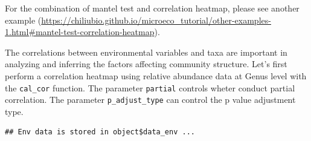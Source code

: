 \documentclass[
]{book}
\newenvironment{Shaded}{\begin{snugshade}}{\end{snugshade}}
\newcommand{\AttributeTok}[1]{\textcolor[rgb]{0.13,0.29,0.53}{#1}}
\newcommand{\CommentTok}[1]{\textcolor[rgb]{0.56,0.35,0.01}{\textit{#1}}}
\newcommand{\ConstantTok}[1]{\textcolor[rgb]{0.56,0.35,0.01}{#1}}
\newcommand{\DecValTok}[1]{\textcolor[rgb]{0.00,0.00,0.81}{#1}}
\newcommand{\FunctionTok}[1]{\textcolor[rgb]{0.13,0.29,0.53}{\textbf{#1}}}
\newcommand{\NormalTok}[1]{#1}
\newcommand{\OtherTok}[1]{\textcolor[rgb]{0.56,0.35,0.01}{#1}}
\newcommand{\SpecialCharTok}[1]{\textcolor[rgb]{0.81,0.36,0.00}{\textbf{#1}}}
\newcommand{\StringTok}[1]{\textcolor[rgb]{0.31,0.60,0.02}{#1}}
\begin{document}
\begin{Shaded}
\end{Shaded}

For the combination of mantel test and correlation heatmap,
please see another example (\url{https://chiliubio.github.io/microeco_tutorial/other-examples-1.html\#mantel-test-correlation-heatmap}).

The correlations between environmental variables and taxa are important in analyzing and inferring the factors affecting community structure.
Let's first perform a correlation heatmap using relative abundance data at Genus level with the \texttt{cal\_cor} function.
The parameter \texttt{partial} controls wheter conduct partial correlation.
The parameter \texttt{p\_adjust\_type} can control the p value adjustment type.

\begin{Shaded}
\end{Shaded}

\begin{verbatim}
## Env data is stored in object$data_env ...
\end{verbatim}

\begin{Shaded}
\end{Shaded}
\end{document}
